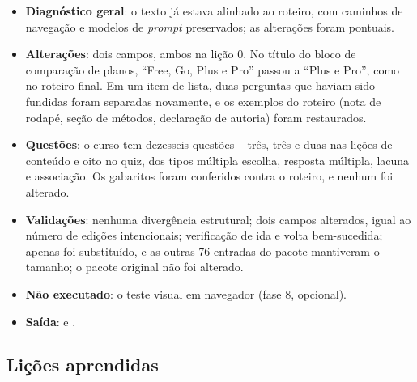 \documentclass[12pt,a4paper]{article}
\begin{document}
\begin{itemize}[leftmargin=*]
\item \textbf{Diagnóstico geral}: o texto já estava alinhado ao roteiro, com caminhos de navegação e modelos de \textit{prompt} preservados; as alterações foram pontuais.
\item \textbf{Alterações}: dois campos, ambos na lição 0. No título do bloco de comparação de planos, ``Free, Go, Plus e Pro'' passou a ``Plus e Pro'', como no roteiro final. Em um item de lista, duas perguntas que haviam sido fundidas foram separadas novamente, e os exemplos do roteiro (nota de rodapé, seção de métodos, declaração de autoria) foram restaurados.
\item \textbf{Questões}: o curso tem dezesseis questões -- três, três e duas nas lições de conteúdo e oito no quiz, dos tipos múltipla escolha, resposta múltipla, lacuna e associação. Os gabaritos foram conferidos contra o roteiro, e nenhum foi alterado.
\item \textbf{Validações}: nenhuma divergência estrutural; dois campos alterados, igual ao número de edições intencionais; verificação de ida e volta bem-sucedida; apenas  foi substituído, e as outras 76 entradas do pacote mantiveram o tamanho; o pacote original não foi alterado.
\item \textbf{Não executado}: o teste visual em navegador (fase 8, opcional).
\item \textbf{Saída}:  e .
\end{itemize}

\subsection{Lições aprendidas}\label{sec:licoes}
\end{document}
